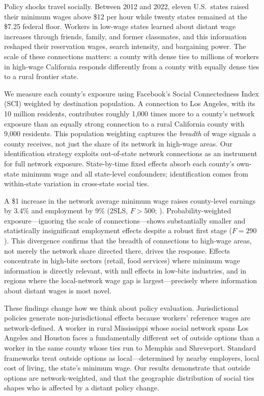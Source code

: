 \documentclass[12pt]{article}
\begin{document}
Policy shocks travel socially. Between 2012 and 2022, eleven U.S.\ states raised their minimum wages above \$12 per hour while twenty states remained at the \$7.25 federal floor. Workers in low-wage states learned about distant wage increases through friends, family, and former classmates, and this information reshaped their reservation wages, search intensity, and bargaining power. The scale of these connections matters: a county with dense ties to millions of workers in high-wage California responds differently from a county with equally dense ties to a rural frontier state.

We measure each county's exposure using Facebook's Social Connectedness Index (SCI) weighted by destination population. A connection to Los Angeles, with its 10 million residents, contributes roughly 1,000 times more to a county's network exposure than an equally strong connection to a rural California county with 9,000 residents. This population weighting captures the \textit{breadth} of wage signals a county receives, not just the share of its network in high-wage areas. Our identification strategy exploits out-of-state network connections as an instrument for full network exposure. State-by-time fixed effects absorb each county's own-state minimum wage and all state-level confounders; identification comes from within-state variation in cross-state social ties.

A \$1 increase in the network average minimum wage raises county-level earnings by 3.4\% and employment by 9\% (2SLS, $F > 500$; ). Probability-weighted exposure---ignoring the scale of connections---shows substantially smaller and statistically insignificant employment effects despite a robust first stage ($F = 290$). This divergence confirms that the breadth of connections to high-wage areas, not merely the network share directed there, drives the response. Effects concentrate in high-bite sectors (retail, food services) where minimum wage information is directly relevant, with null effects in low-bite industries, and in regions where the local-network wage gap is largest---precisely where information about distant wages is most novel.

These findings change how we think about policy evaluation. Jurisdictional policies generate non-jurisdictional effects because workers' reference wages are network-defined. A worker in rural Mississippi whose social network spans Los Angeles and Houston faces a fundamentally different set of outside options than a worker in the same county whose ties run to Memphis and Shreveport. Standard frameworks treat outside options as local---determined by nearby employers, local cost of living, the state's minimum wage. Our results demonstrate that outside options are network-weighted, and that the geographic distribution of social ties shapes who is affected by a distant policy change.
\end{document}
